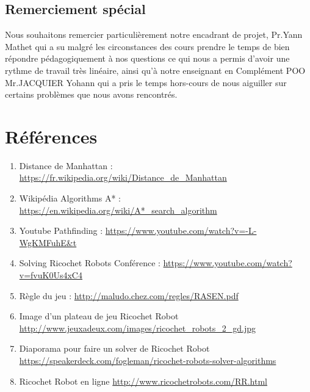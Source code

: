 \documentclass{rapportECL}
\begin{document}
\subsection{Remerciement spécial}

Nous souhaitons remercier particulièrement notre encadrant de projet, Pr.Yann Mathet qui a su malgré les circonstances des cours prendre le temps de bien répondre pédagogiquement à nos questions ce qui nous a permis d'avoir une rythme de travail très linéaire, ainsi qu'à notre enseignant en Complément POO Mr.JACQUIER Yohann qui a pris le temps hors-cours de nous aiguiller sur certains problèmes que nous avons rencontrés.

\newpage
\section{Références}
\label{Références}


\begin{enumerate}
    \item Distance de Manhattan : \url{https://fr.wikipedia.org/wiki/Distance_de_Manhattan}
    \item Wikipédia Algorithms A* : \url{https://en.wikipedia.org/wiki/A*_search_algorithm}
    \item Youtube Pathfinding : \url{https://www.youtube.com/watch?v=-L-WgKMFuhE&t}
    \item Solving Ricochet Robots Conférence : \url{https://www.youtube.com/watch?v=fvuK0Us4xC4}
    \item Règle du jeu :
    \url{http://maludo.chez.com/regles/RASEN.pdf}
    \item Image d'un plateau de jeu Ricochet Robot \url{http://www.jeuxadeux.com/images/ricochet_robots_2_gd.jpg}
    \item Diaporama pour faire un solver de Ricochet Robot \url{https://speakerdeck.com/fogleman/ricochet-robots-solver-algorithms}
    \item Ricochet Robot en ligne
    \url{http://www.ricochetrobots.com/RR.html}
    
\end{enumerate}
\end{document}
